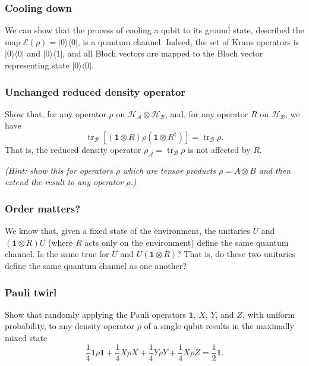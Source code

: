 \documentclass[fleqn]{article}
\begin{document}
\hypertarget{cooling-down}{%
\subsubsection{Cooling down}\label{cooling-down}}

We can show that the process of cooling a qubit to its ground state, described the map \(\mathcal{E}(\rho)=|0\rangle\langle 0|\), is a quantum channel.
Indeed, the set of Kraus operators is \(|0\rangle\langle 0|\) and \(|0\rangle\langle 1|\), and all Bloch vectors are mapped to the Bloch vector representing state \(|0\rangle\langle 0|\).

\hypertarget{unchanged-reduced-density-operator}{%
\subsubsection{Unchanged reduced density operator}\label{unchanged-reduced-density-operator}}

Show that, for any operator \(\rho\) on \(\mathcal{H}_\mathcal{A}\otimes\mathcal{H}_\mathcal{B}\), and, for any operator \(R\) on \(\mathcal{H}_\mathcal{B}\), we have
\[
  \operatorname{tr}_\mathcal{B} \left[(\mathbf{1}\otimes R) \rho (\mathbf{1}\otimes R^\dagger)\right]
  = \operatorname{tr}_\mathcal{B} \rho.
\]
That is, the reduced density operator \(\rho_\mathcal{A}=\operatorname{tr}_\mathcal{B} \rho\) is not affected by \(R\).

\emph{(Hint: show this for operators \(\rho\) which are tensor products \(\rho=A\otimes B\) and then extend the result to any operator \(\rho\).)}

\hypertarget{order-matters}{%
\subsubsection{Order matters?}\label{order-matters}}

We know that, given a fixed state of the environment, the unitaries \(U\) and \((\mathbf{1}\otimes R)U\) (where \(R\) acts only on the environment) define the same quantum channel.
Is the same true for \(U\) and \(U(\mathbf{1}\otimes R)\)?
That is, do these two unitaries define the same quantum channel as one another?

\hypertarget{pauli-twirl}{%
\subsubsection{Pauli twirl}\label{pauli-twirl}}

Show that randomly applying the Pauli operators \(\mathbf{1}\), \(X\), \(Y\), and \(Z\), with uniform probability, to any density operator \(\rho\) of a single qubit results in the maximally mixed state
\[
  \frac{1}{4} \mathbf{1}\rho\mathbf{1}+\frac{1}{4} X\rho X + \frac{1}{4} Y\rho Y + \frac{1}{4} X\rho Z
  = \frac{1}{2}\mathbf{1}.
\]
\end{document}
